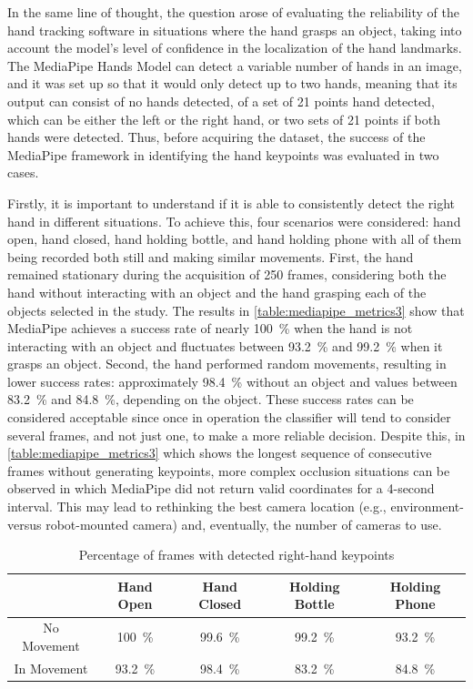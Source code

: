 In the same line of thought, the question arose of evaluating the reliability of the hand tracking software in situations where the hand grasps an object, taking into account the model's level of confidence \cite{Zhang2020} in the localization of the hand landmarks. The MediaPipe Hands Model can detect a variable number of hands in an image, and it was set up so that it would only detect up to two hands, meaning that its output can consist of no hands detected, of a set of 21 points hand detected, which can be either the left or the right hand, or two sets of 21 points if both hands were detected. Thus, before acquiring the dataset, the success of the MediaPipe framework in identifying the hand keypoints was evaluated in two cases.

Firstly, it is important to understand if it is able to consistently detect the right hand in different situations. To achieve this, four scenarios were considered: hand open, hand closed, hand holding bottle, and hand holding phone with all of them being recorded both still and making similar movements. First, the hand remained stationary during the acquisition of 250 frames, considering both the hand without interacting with an object and the hand grasping each of the objects selected in the study. The results in \autoref{table:mediapipe_metrics3} show that MediaPipe achieves a success rate of nearly \SI{100}{\percent} when the hand is not interacting with an object and fluctuates between \SI{93.2}{\percent} and \SI{99.2}{\percent} when it grasps an object. Second, the hand performed random movements, resulting in lower success rates: approximately \SI{98.4}{\percent} without an object and values between \SI{83.2}{\percent} and \SI{84.8}{\percent}, depending on the object. These success rates can be considered acceptable since once in operation the classifier will tend to consider several frames, and not just one, to make a more reliable decision. Despite this, in \autoref{table:mediapipe_metrics3} which shows the longest sequence of consecutive frames without generating keypoints, more complex occlusion situations can be observed in which MediaPipe did not return valid coordinates for a 4-second interval. This may lead to rethinking the best camera location (e.g., environment- versus robot-mounted camera) and, eventually, the number of cameras to use.

\begin{table}[ht]
    \centering
    \caption{Percentage of frames with detected right-hand keypoints}
    \label{table:mediapipe_metrics3}
    \begin{tabular}{ccccc}
        \toprule
        & Hand Open & Hand Closed & Holding Bottle & Holding Phone \\
        \midrule
        No Movement & \SI{100}{\percent} & \SI{99.6}{\percent} & \SI{99.2}{\percent} & \SI{93.2}{\percent} \\
        In Movement & \SI{93.2}{\percent} & \SI{98.4}{\percent} & \SI{83.2}{\percent} & \SI{84.8}{\percent} \\
        \bottomrule
    \end{tabular}
\end{table}

